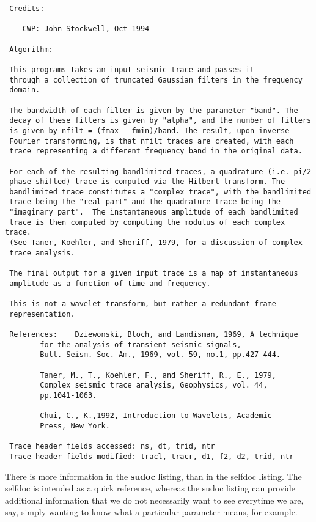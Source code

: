 {{{\begin{verbatim}
 Credits:

	CWP: John Stockwell, Oct 1994

 Algorithm:

 This programs takes an input seismic trace and passes it
 through a collection of truncated Gaussian filters in the frequency
 domain.

 The bandwidth of each filter is given by the parameter "band". The
 decay of these filters is given by "alpha", and the number of filters
 is given by nfilt = (fmax - fmin)/band. The result, upon inverse
 Fourier transforming, is that nfilt traces are created, with each
 trace representing a different frequency band in the original data.

 For each of the resulting bandlimited traces, a quadrature (i.e. pi/2
 phase shifted) trace is computed via the Hilbert transform. The 
 bandlimited trace constitutes a "complex trace", with the bandlimited
 trace being the "real part" and the quadrature trace being the 
 "imaginary part".  The instantaneous amplitude of each bandlimited
 trace is then computed by computing the modulus of each complex trace.
 (See Taner, Koehler, and Sheriff, 1979, for a discussion of complex
 trace analysis.

 The final output for a given input trace is a map of instantaneous
 amplitude as a function of time and frequency.

 This is not a wavelet transform, but rather a redundant frame
 representation.

 References: 	Dziewonski, Bloch, and Landisman, 1969, A technique
		for the analysis of transient seismic signals,
		Bull. Seism. Soc. Am., 1969, vol. 59, no.1, pp.427-444.

		Taner, M., T., Koehler, F., and Sheriff, R., E., 1979,
		Complex seismic trace analysis, Geophysics, vol. 44,
		pp.1041-1063.

 		Chui, C., K.,1992, Introduction to Wavelets, Academic
		Press, New York.

 Trace header fields accessed: ns, dt, trid, ntr
 Trace header fields modified: tracl, tracr, d1, f2, d2, trid, ntr

\end{verbatim}}\noindent

There is more information in the {\bf sudoc\/} listing,
than in the selfdoc listing. The selfdoc is intended as a quick reference,
whereas the sudoc listing can provide additional information
that we do not necessarily want to see everytime we are, say, simply wanting
to know what a particular parameter means, for example.
 
}}
